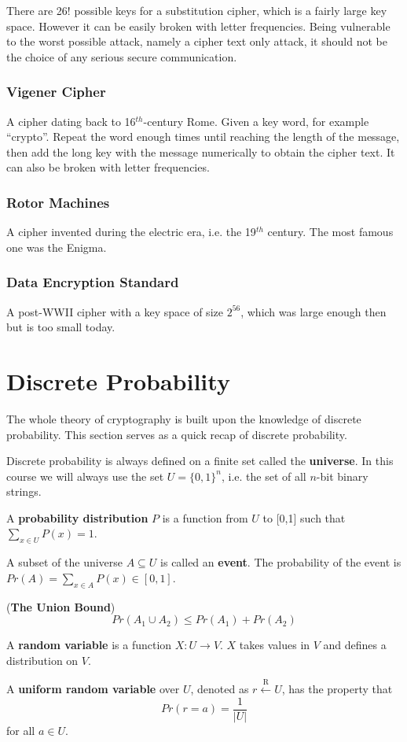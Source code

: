 There are 26! possible keys for a substitution cipher, which is a fairly large key space. However it can be easily broken with letter frequencies. Being vulnerable to the worst possible attack, namely a cipher text only attack, it should not be the choice of any serious secure communication.
\subsubsection{Vigener Cipher}
A cipher dating back to 16$^{th}$-century Rome. Given a key word, for example ``crypto''. Repeat the word enough times until reaching the length of the message, then add the long key with the message numerically to obtain the cipher text. It can also be broken with letter frequencies. 
\subsubsection{Rotor Machines}
A cipher invented during the electric era, i.e. the 19$^{th}$ century. The most famous one was the Enigma.
\subsubsection{Data Encryption Standard}
A post-WWII cipher with a key space of size $2^{56}$, which was large enough then but is too small today. 
\section{Discrete Probability}
The whole theory of cryptography is built upon the knowledge of discrete probability. This section serves as a quick recap of discrete probability.

Discrete probability is always defined on a finite set called the \textbf{universe}. In this course we will always use the set $U=\{0,1\}^n$, i.e. the set of all $n$-bit binary strings.
\begin{definition}
A \textbf{probability distribution} $P$ is a function from $U$ to [0,1] such that $\sum\limits_{x\in U}P(x)=1$.
\end{definition}
\begin{definition}
A subset of the universe $A\subseteq U$ is called an \textbf{event}. The probability of the event is $Pr(A)=\sum\limits_{x\in A}P(x)\in[0,1]$.
\end{definition}
\begin{theorem}(\textbf{The Union Bound})
\[Pr(A_1 \cup A_2)\le Pr(A_1)+Pr(A_2)\]
\end{theorem}
\begin{definition}
A \textbf{random variable} is a function $X:U\rightarrow V$. $X$ takes values in $V$ and defines a distribution on $V$.
\end{definition}
\begin{definition}A \textbf{uniform random variable} over $U$, denoted as $r\xleftarrow{\text{R}} U$, has the property that 
\[Pr(r = a)=\frac{1}{\lvert U\rvert}\]
for all $a\in U$.
\end{definition}

